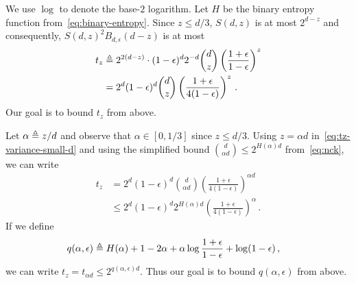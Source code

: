 
  We use $\log$ to denote the base-$2$ logarithm. 
  Let $H$ be the binary entropy function from~\eqref{eq:binary-entropy}. 
  Since $z \leq d/3$, $S(d,z)$ is at most $2^{d-z}$ and consequently, 
  $S(d, z)^2 B_{d, \epsilon}(d-z)$ is at most
  \begin{align}\label{eq:tz-variance-small-d}
  t_z&\triangleq 2^{2(d-z)} \cdot (1-\epsilon)^d 2^{-d} {d \choose z}  \left(\frac{1+\epsilon}{1-\epsilon}\right)^{z} \nonumber \\
  &= 2^d(1-\epsilon)^d {d \choose z} \left(\frac{1+\epsilon}{4(1-\epsilon)}\right)^{z}\,.
  \end{align}
  Our goal is to bound $t_z$ from above. 

  Let $\alpha \triangleq z/d$ and observe that $\alpha \in [0, 1/3]$ since $z \leq d/3$.
  Using $z = \alpha d$ in~\eqref{eq:tz-variance-small-d} and 
  using the simplified bound $\binom{d}{\alpha d} \leq 2^{H(\alpha)d}$ from~\eqref{eq:nck}, 
  we can write
  \begin{align*}
  t_z
  &= 2^{d}(1-\epsilon)^d {d \choose \alpha d} \left(\frac{1+\epsilon}{4(1-\epsilon)}\right)^{\alpha d} \\
  &\leq 2^d
  (1-\epsilon)^d 
  2^{H(\alpha)d} 
  \left(\frac{1+\epsilon}{4(1-\epsilon)}\right)^{\alpha}
  \,.
  \end{align*}
  If we define 
  \begin{align*}
  q(\alpha, \epsilon)
  &\triangleq H(\alpha)+1-2\alpha+ \alpha \log \frac{1+\epsilon}{1-\epsilon}+\log(1-\epsilon)
  \,,
  \end{align*}
  we can write $t_z = t_{\alpha d} \leq 2^{q(\alpha, \epsilon)d}$. 
  Thus our goal is to bound $q(\alpha, \epsilon)$ from above. 

